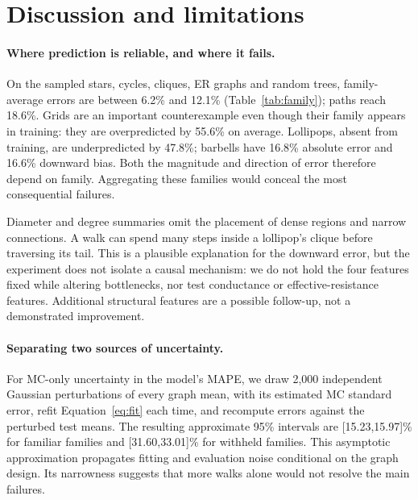\documentclass{article}
\begin{document}
\section{Discussion and limitations}
\begin{table}[h]
\centering\scriptsize\setlength{\tabcolsep}{3pt}

\caption{Four-statistic model by family, on held-out graphs. Error is MAPE; bias is the mean signed percentage error, $100(\widetilde C/\widehat C-1)$. Family sample sizes are very small.}
\label{tab:family}
\end{table}

\paragraph{Where prediction is reliable, and where it fails.}
On the sampled stars, cycles, cliques, ER graphs and random trees, family-average errors are between 6.2\% and 12.1\% (Table~\ref{tab:family}); paths reach 18.6\%. Grids are an important counterexample even though their family appears in training: they are overpredicted by 55.6\% on average. Lollipops, absent from training, are underpredicted by 47.8\%; barbells have 16.8\% absolute error and 16.6\% downward bias. Both the magnitude and direction of error therefore depend on family. Aggregating these families would conceal the most consequential failures.

Diameter and degree summaries omit the placement of dense regions and narrow connections. A walk can spend many steps inside a lollipop's clique before traversing its tail. This is a plausible explanation for the downward error, but the experiment does not isolate a causal mechanism: we do not hold the four features fixed while altering bottlenecks, nor test conductance or effective-resistance features. Additional structural features are a possible follow-up, not a demonstrated improvement.

\paragraph{Separating two sources of uncertainty.}
For MC-only uncertainty in the model's MAPE, we draw 2,000 independent Gaussian perturbations of every graph mean, with its estimated MC standard error, refit Equation~\ref{eq:fit} each time, and recompute errors against the perturbed test means. The resulting approximate 95\% intervals are [15.23,15.97]\% for familiar families and [31.60,33.01]\% for withheld families. This asymptotic approximation propagates fitting and evaluation noise conditional on the graph design. Its narrowness suggests that more walks alone would not resolve the main failures.
\end{document}
